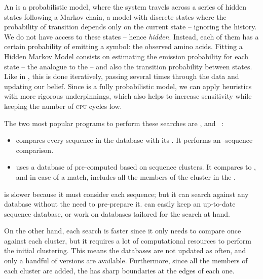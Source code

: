 An \HMM{} is a probabilistic model, where the system travels across a series of hidden states following a Markov chain,  
a model with discrete states where the probability of transition depends only on the current state -- ignoring the history.
We do not have access to these states -- hence \emph{hidden}.
Instead, each of them has a certain probability of emitting a symbol: the observed amino acids.
Fitting a Hidden Markov Model consists on estimating the emission probability for each state -- the analogue to the \PSSMs{} -- and also the transition probability between states.
Like in \PSIBLAST, this is done iteratively, passing several times through the data and updating our belief.
Since \HMM{} is a fully probabilistic model, we can apply heuristics with more rigorous underpinnings, which also helps to increase sensitivity while keeping the number of \textsc{cpu} cycles low.

The two most popular programs to perform these searches are \JackHMMER{} \citep{jh}, and \HHBlits~\citep{hhblits}:

\begin{itemize}
\item \JackHMMER{} compares every sequence in the database with its \HMM.
It performs an \HMM-sequence comparison.
\item \HHBlits{} uses a database of pre-computed \HMMs{} based on sequence clusters.
It compares \HMM{} to \HMM, and in case of a match, includes all the members of the cluster in the \MSA.
\end{itemize}

\JackHMMER{} is slower because it must consider each sequence; but it can search against any database without the need to pre-prepare it. 
\JackHMMER{} can easily keep an up-to-date sequence database, or work on databases tailored for the search at hand.

On the other hand, each \HHBlits{} search is faster since it only needs to compare once against each cluster, but it requires a lot of computational resources to perform the initial clustering.
This means the databases are not updated as often, and only a handful of versions are available.
Furthermore, since all the members of each cluster are added, the \MSA{} has sharp boundaries at the edges of each one.




